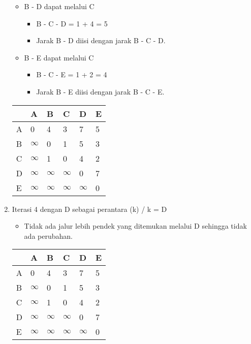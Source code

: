\begin{enumerate}
\begin{itemize}
\begin{itemize}
        \end{itemize}
        \item B - D dapat melalui C
        \begin{itemize}
            \item B - C - D = 1 + 4 = 5
            \item Jarak B - D diisi dengan jarak B - C - D.
        \end{itemize}
        \item B - E dapat melalui C
        \begin{itemize}
            \item B - C - E = 1 + 2 = 4
            \item Jarak B - E diisi dengan jarak B - C - E.
        \end{itemize}
    \end{itemize}
    \begin{table}[h]
        \begin{tabular}{|l|l|l|l|l|l|}
        \hline
          & A        & B        & C        & D        & E        \\ \hline
        A & 0        & 4        & 3        & 7        & 5 \\ \hline
        B & $\infty$ & 0        & 1        & 5        & 3 \\ \hline
        C & $\infty$ & 1        & 0        & 4        & 2        \\ \hline
        D & $\infty$ & $\infty$ & $\infty$ & 0        & 7        \\ \hline
        E & $\infty$ & $\infty$ & $\infty$ & $\infty$ & 0        \\ \hline
        \end{tabular}
    \end{table}

    \item Iterasi 4 dengan D sebagai perantara (k) / k = D
    \begin{itemize}
        \item Tidak ada jalur lebih pendek yang ditemukan melalui D sehingga tidak ada perubahan.
    \end{itemize}
    \begin{table}[h]
        \begin{tabular}{|l|l|l|l|l|l|}
        \hline
          & A        & B        & C        & D        & E        \\ \hline
        A & 0        & 4        & 3        & 7        & 5 \\ \hline
        B & $\infty$ & 0        & 1        & 5        & 3 \\ \hline
        C & $\infty$ & 1        & 0        & 4        & 2        \\ \hline
        D & $\infty$ & $\infty$ & $\infty$ & 0        & 7        \\ \hline
        E & $\infty$ & $\infty$ & $\infty$ & $\infty$ & 0        \\ \hline
        \end{tabular}
    \end{table}


\end{enumerate}
